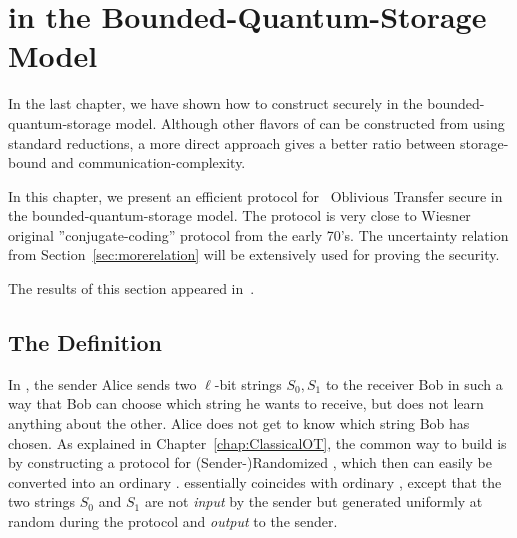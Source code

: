 \chapter[\OT in the Bounded-Quantum-Storage Model]
{\OT in the Bounded-Quantum-Storage Model}\label{chap:12OT}
In the last chapter, we have shown how to construct \RabinOT securely
in the bounded-quantum-storage
model. Although other flavors of \pOT
can be constructed from \RabinOT using standard reductions, a more
direct approach gives a better ratio between storage-bound and
communication-complexity.

In this chapter, we present an efficient protocol for \onetwo\
Oblivious Transfer secure in the bounded-quantum-storage model. The protocol
is very close to Wiesner original \index{conjugate coding}''conjugate-coding'' protocol
\cite{Wiesner83} from the early 70's. The uncertainty relation from
Section~\ref{sec:morerelation} will be extensively used for proving the
security. 

The results of this section appeared in~\cite{DFRSS07}.

\section{The Definition} %
In \lStringOT, the sender Alice sends two $\ell$-bit strings $S_0,
S_1$ to the receiver Bob in such a way that Bob can choose which
string he wants to receive, but does not learn anything about the
other. Alice does not get to know which string Bob has chosen. As
explained in Chapter~\ref{chap:ClassicalOT}, the common way to build
\lStringOT is by constructing a protocol for
\mbox{(Sender-)}Randomized \lStringOT, which then can easily be
converted into an ordinary \lStringOT. \RandlStringOT essentially
coincides with ordinary \lStringOT, except that the two strings $S_0$
and $S_1$ are not \emph{input} by the sender but generated uniformly
at random during the protocol and \emph{output} to the sender.


